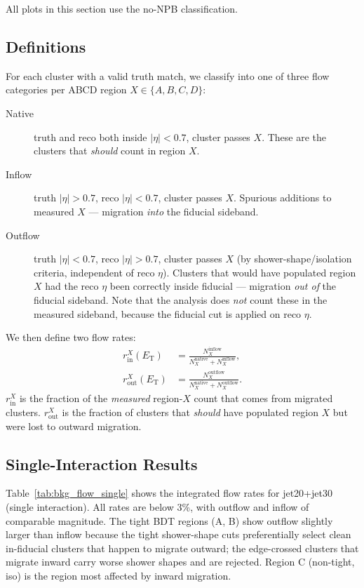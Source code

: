 \documentclass[11pt,letterpaper]{article}
\newcommand{\ET}{\ensuremath{E_{\text{T}}}}
\newcommand{\abseta}{\ensuremath{|\eta|}}
\begin{document}
All plots in this section use the no-NPB classification.

\subsection{Definitions}
\label{subsec:bkg_defs}

For each cluster with a valid truth match, we classify into one of three flow
categories per ABCD region $X \in \{A, B, C, D\}$:
\begin{description}
  \item[Native] truth and reco both inside $\abseta < 0.7$, cluster passes $X$.
    These are the clusters that \emph{should} count in region $X$.
  \item[Inflow] truth $\abseta > 0.7$, reco $\abseta < 0.7$, cluster passes $X$.
    Spurious additions to measured $X$ --- migration \emph{into} the fiducial
    sideband.
  \item[Outflow] truth $\abseta < 0.7$, reco $\abseta > 0.7$, cluster passes
    $X$ (by shower-shape/isolation criteria, independent of reco $\eta$).
    Clusters that would have populated region $X$ had the reco $\eta$ been
    correctly inside fiducial --- migration \emph{out of} the fiducial
    sideband. Note that the analysis does \emph{not} count these in the
    measured sideband, because the fiducial cut is applied on reco $\eta$.
\end{description}

We then define two flow rates:
\begin{align}
  r_\text{in}^{X}(\ET) &= \frac{N_X^\text{inflow}}
                              {N_X^\text{native} + N_X^\text{inflow}},
  \label{eq:bkg_inflow_rate} \\
  r_\text{out}^{X}(\ET) &= \frac{N_X^\text{outflow}}
                              {N_X^\text{native} + N_X^\text{outflow}}.
  \label{eq:bkg_outflow_rate}
\end{align}
$r_\text{in}^{X}$ is the fraction of the \emph{measured} region-$X$ count that
comes from migrated clusters. $r_\text{out}^{X}$ is the fraction of clusters
that \emph{should} have populated region $X$ but were lost to outward migration.

\subsection{Single-Interaction Results}
\label{subsec:bkg_flow_single}

Table~\ref{tab:bkg_flow_single} shows the integrated flow rates for jet20+jet30
(single interaction). All rates are below 3\%, with outflow and inflow of
comparable magnitude. The tight BDT regions (A, B) show outflow slightly larger
than inflow because the tight shower-shape cuts preferentially select clean
in-fiducial clusters that happen to migrate outward; the edge-crossed clusters
that migrate inward carry worse shower shapes and are rejected. Region C
(non-tight, iso) is the region most affected by inward migration.
\end{document}
